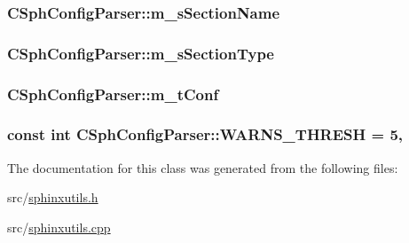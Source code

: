 \hypertarget{classCSphConfigParser_a2b27b7a6dc0325826be8251809c47978}{
\subsubsection[{m\-\_\-s\-Section\-Name}]{ C\-Sph\-Config\-Parser\-::m\-\_\-s\-Section\-Name\hspace{0.3cm}{\ttfamily [protected]}}}\label{classCSphConfigParser_a2b27b7a6dc0325826be8251809c47978}
\hypertarget{classCSphConfigParser_aee98856a91de6866b13b1bcc311d19b3}{
\subsubsection[{m\-\_\-s\-Section\-Type}]{ C\-Sph\-Config\-Parser\-::m\-\_\-s\-Section\-Type\hspace{0.3cm}{\ttfamily [protected]}}}\label{classCSphConfigParser_aee98856a91de6866b13b1bcc311d19b3}
\hypertarget{classCSphConfigParser_a6221f2ed1927dd73b0f01469a9985097}{
\subsubsection[{m\-\_\-t\-Conf}]{ C\-Sph\-Config\-Parser\-::m\-\_\-t\-Conf}}\label{classCSphConfigParser_a6221f2ed1927dd73b0f01469a9985097}
\hypertarget{classCSphConfigParser_a0a90b1213c5d9073677aa98da209b630}{
\subsubsection[{W\-A\-R\-N\-S\-\_\-\-T\-H\-R\-E\-S\-H}]{\setlength{\rightskip}{0pt plus 5cm}const {\bf int} C\-Sph\-Config\-Parser\-::\-W\-A\-R\-N\-S\-\_\-\-T\-H\-R\-E\-S\-H = 5\hspace{0.3cm}{\ttfamily [static]}, {\ttfamily [protected]}}}\label{classCSphConfigParser_a0a90b1213c5d9073677aa98da209b630}


The documentation for this class was generated from the following files\-:\begin{DoxyCompactItemize}
\item 
src/\hyperlink{sphinxutils_8h}{sphinxutils.\-h}\item 
src/\hyperlink{sphinxutils_8cpp}{sphinxutils.\-cpp}\end{DoxyCompactItemize}

